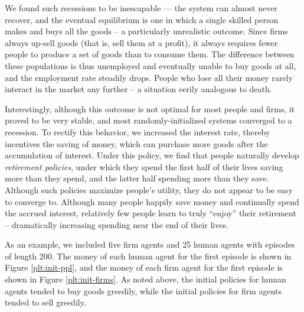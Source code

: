 \documentclass[twoside,twocolumn]{article}
\begin{document}
We found such recessions to be inescapable — the system can almost never recover, and the eventual equilibrium is one in which a single skilled person makes and buys all the goods -- a particularly unrealistic outcome. Since firms always up-sell goods (that is, sell them at a profit), it always requires fewer people to produce a set of goods than to consume them. The difference between these populations is thus unemployed and eventually unable to buy goods at all, and the employment rate steadily drops. People who lose all their money rarely interact in the market any further -- a situation eerily analogous to death.

Interestingly, although this outcome is not optimal for most people and firms, it proved to be very stable, and most randomly-initialized systems converged to a recession. To rectify this behavior, we increased the interest rate, thereby incentives the saving of money, which can purchase more goods after the accumulation of interest. Under this policy, we find that people naturally develop \textit{retirement policies}, under which they spend the first half of their lives saving more than they spend, and the latter half spending more than they save. Although such policies maximize people’s utility, they do not appear to be easy to converge to. Although many people happily save money and continually spend the accrued interest, relatively few people learn to truly ``enjoy'' their retirement -- dramatically increasing spending near the end of their lives.

As an example, we included five firm agents and 25 human agents with episodes of length 200. The money of each human agent for the first episode is shown in Figure \ref{plt:init-ppl}, and the money of each firm agent for the first episode is shown in Figure \ref{plt:init-firms}. As noted above, the initial policies for human agents tended to buy goods greedily, while the initial policies for firm agents tended to sell greedily.
\end{document}
